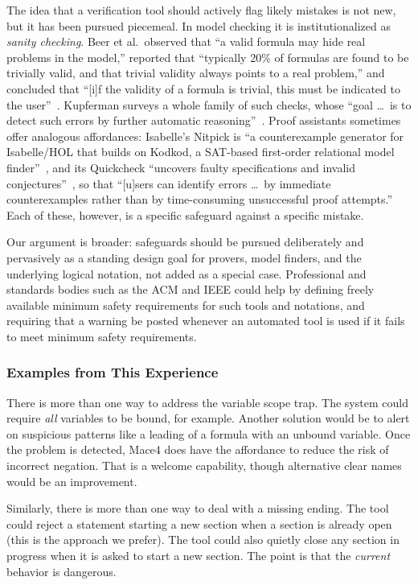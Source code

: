 The idea that a verification tool should actively flag likely mistakes is not new, but it has been pursued piecemeal. In model checking it is institutionalized as \emph{sanity checking}. Beer et al.\ observed that ``a valid formula may hide real problems in the model,'' reported that ``typically 20\% of formulas are found to be trivially valid, and that trivial validity always points to a real problem,'' and concluded that ``[i]f the validity of a formula is trivial, this must be indicated to the user''~\cite{beer2001vacuity}. Kupferman surveys a whole family of such checks, whose ``goal \dots\ is to detect such errors by further automatic reasoning''~\cite{kupferman2006sanity}. Proof assistants sometimes offer analogous affordances: Isabelle's Nitpick is ``a counterexample generator for Isabelle/HOL that builds on Kodkod, a SAT-based first-order relational model finder''~\cite{blanchette2010nitpick}, and its Quickcheck ``uncovers faulty specifications and invalid conjectures''~\cite{bulwahn2012quickcheck}, so that ``[u]sers can identify errors \dots\ by immediate counterexamples rather than by time-consuming unsuccessful proof attempts.'' Each of these, however, is a specific safeguard against a specific mistake.

Our argument is broader: safeguards should be pursued deliberately and pervasively as a standing design goal for provers, model finders, and the underlying logical notation, not added as a special case. Professional and standards bodies such as the ACM and IEEE could help by defining freely available minimum safety requirements for such tools and notations, and requiring that a warning be posted whenever an automated tool is used if it fails to meet minimum safety requirements.

\subsubsection{Examples from This Experience}

There is more than one way to address the variable scope trap. The system could require \emph{all} variables to be bound, for example. Another solution would be to alert on suspicious patterns like a leading \code{-} of a formula with an unbound variable. Once the problem is detected, Mace4 does have the affordance  to reduce the risk of incorrect negation. That is a welcome capability, though alternative clear names would be an improvement.

Similarly, there is more than one way to deal with a missing ending. The tool could reject a statement starting a new section when a section is already open (this is the approach we prefer). The tool could also quietly close any section in progress when it is asked to start a new section. The point is that the \emph{current} behavior is dangerous.

